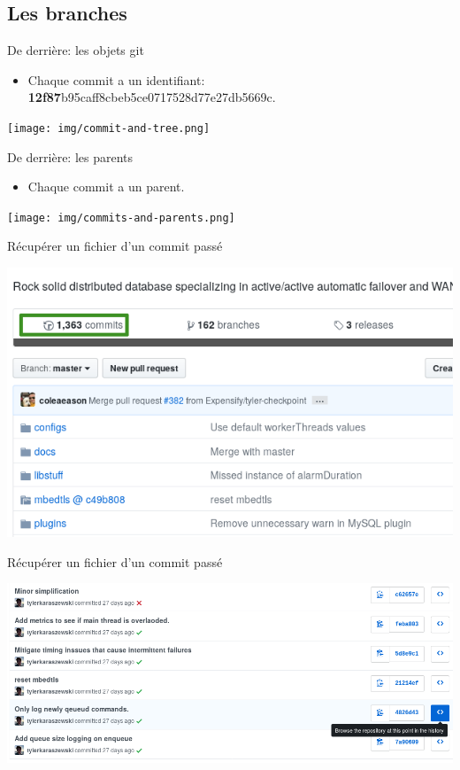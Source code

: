 \documentclass{beamer}
\begin{document}
\subsection{Les branches}

\begin{frame}{De derrière: les objets git}
    \begin{itemize}
        \item Chaque commit a un identifiant: \textbf{12f87}b95caff8cbeb5ce0717528d77e27db5669c.
    \end{itemize}
    \begin{center}
    \texttt{[image: img/commit-and-tree.png]}
    \end{center}
\end{frame}

\begin{frame}{De derrière: les parents}
    \begin{itemize}
        \item Chaque commit a un parent.
    \end{itemize}
    \texttt{[image: img/commits-and-parents.png]}
\end{frame}

\begin{frame}{Récupérer un fichier d'un commit passé}
    \begin{center}
    	\includegraphics[scale=0.5]{img/rollback_1.png}
    \end{center}
\end{frame}

\begin{frame}{Récupérer un fichier d'un commit passé}
    \begin{center}
    	\includegraphics[scale=0.3]{img/rollback_2.png}
    \end{center}
\end{frame}
\end{document}
